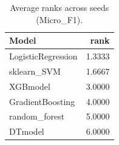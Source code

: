 \begin{table}[t]
\centering
\begin{tabular}{lr}
\toprule
Model & rank \\
\midrule
LogisticRegression & 1.3333 \\
sklearn_SVM & 1.6667 \\
XGBmodel & 3.0000 \\
GradientBoosting & 4.0000 \\
random_forest & 5.0000 \\
DTmodel & 6.0000 \\
\bottomrule
\end{tabular}
\caption{Average ranks across seeds (Micro_F1).}
\label{tab:avg_rank_Micro_F1}
\end{table}
